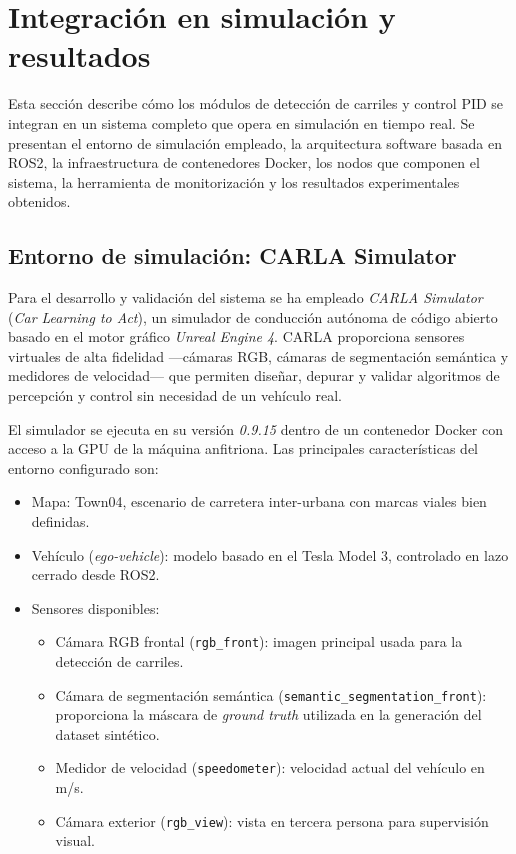 \documentclass[12pt, a4paper]{article}
\begin{document}
\section{Integración en simulación y resultados}
\label{sec:integracion}

Esta sección describe cómo los módulos de detección de carriles y control PID se integran en un sistema completo que opera en simulación en tiempo real. Se presentan el entorno de simulación empleado, la arquitectura software basada en ROS2, la infraestructura de contenedores Docker, los nodos que componen el sistema, la herramienta de monitorización y los resultados experimentales obtenidos.

\subsection{Entorno de simulación: CARLA Simulator}

Para el desarrollo y validación del sistema se ha empleado \textit{CARLA Simulator} (\textit{Car Learning to Act}), un simulador de conducción autónoma de código abierto basado en el motor gráfico \textit{Unreal Engine 4}. CARLA proporciona sensores virtuales de alta fidelidad —cámaras RGB, cámaras de segmentación semántica y medidores de velocidad— que permiten diseñar, depurar y validar algoritmos de percepción y control sin necesidad de un vehículo real.

El simulador se ejecuta en su versión \textit{0.9.15} dentro de un contenedor Docker con acceso a la GPU de la máquina anfitriona. Las principales características del entorno configurado son:

\begin{itemize}
    \item Mapa: Town04, escenario de carretera inter-urbana con marcas viales bien definidas.
    \item Vehículo (\textit{ego-vehicle}): modelo basado en el Tesla Model 3, controlado en lazo cerrado desde ROS2.
    \item Sensores disponibles:
          \begin{itemize}
              \item Cámara RGB frontal (\texttt{rgb\_front}): imagen principal usada para la detección de carriles.
              \item Cámara de segmentación semántica (\texttt{semantic\_segmentation\_front}): proporciona la máscara de \textit{ground truth} utilizada en la generación del dataset sintético.
              \item Medidor de velocidad (\texttt{speedometer}): velocidad actual del vehículo en m/s.
              \item Cámara exterior (\texttt{rgb\_view}): vista en tercera persona para supervisión visual.
          \end{itemize}
\end{itemize}
\end{document}
